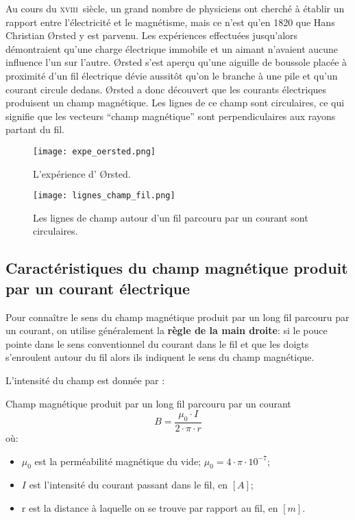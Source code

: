 Au cours du \textsc{xviii}\ieme~siècle, un grand nombre de physiciens ont cherché à établir un rapport entre l'électricité et le magnétisme, mais ce n'est qu'en 1820 que Hans Christian {\O}rsted y est parvenu. Les expériences effectuées jusqu'alors démontraient qu'une charge électrique immobile et un aimant n'avaient aucune influence l'un sur l'autre.
{\O}rsted s'est aperçu qu'une aiguille de boussole placée à proximité d'un fil électrique dévie aussitôt qu'on le branche à une pile et qu'un courant circule dedans.
    {\O}rsted a donc découvert que les courants électriques produisent un champ magnétique. Les lignes de ce champ sont circulaires, ce qui signifie que les vecteurs \enquote{champ magnétique} sont perpendiculaires aux rayons partant du fil.

\begin{figure}[!ht]
    \centering
    \begin{minipage}[b]{.47\linewidth}
        \centering
        \texttt{[image: expe\_oersted.png]}
        \caption{L'expérience d' {\O}rsted.}
        \label{expe_oersted}
    \end{minipage}
    \begin{minipage}[b]{.47\linewidth}
        \centering
        \texttt{[image: lignes\_champ\_fil.png]}
        \caption{Les lignes de champ autour d'un fil parcouru par un courant sont circulaires.}
        \label{lignes_champ_fil}
    \end{minipage}
\end{figure}

\newpage

\subsection{Caractéristiques du champ magnétique produit par un courant électrique}
Pour connaître le sens du champ magnétique produit par un long fil parcouru par un courant, on utilise généralement la \textbf{règle de la main droite}: si le pouce pointe dans le sens conventionnel du courant dans le fil et que les doigts s'enroulent autour du fil alors ils indiquent le sens du champ magnétique.

L'intensité du champ est donnée par :
\begin{encadre_equation*}{Champ magnétique produit par un long fil parcouru par un courant}
    \begin{equation}
        B=\frac{\mu_0 \cdot I}{2 \cdot \pi \cdot r}
    \end{equation} où:
    \begin{itemize}[label=\textbullet]
        \item \(\mu_0\) est la perméabilité magnétique du vide; \(\mu_0=4 \cdot \pi \cdot 10^{-7}\);
        \item \(I\) est l'intensité du courant passant dans le fil, en \([A]\);
        \item r est la distance à laquelle on se trouve par rapport au fil, en \([m]\).
    \end{itemize}
\end{encadre_equation*}

